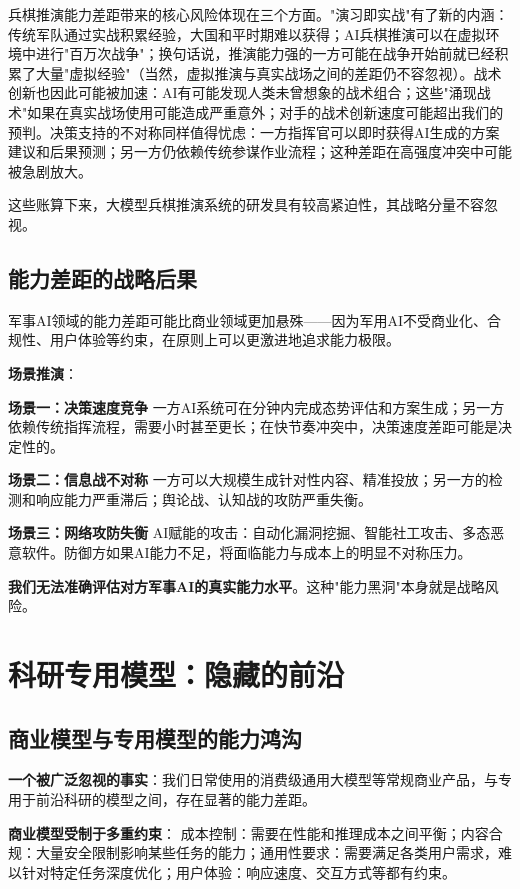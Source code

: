 兵棋推演能力差距带来的核心风险体现在三个方面。"演习即实战"有了新的内涵：传统军队通过实战积累经验，大国和平时期难以获得；AI兵棋推演可以在虚拟环境中进行"百万次战争"；换句话说，推演能力强的一方可能在战争开始前就已经积累了大量"虚拟经验"（当然，虚拟推演与真实战场之间的差距仍不容忽视）。战术创新也因此可能被加速：AI有可能发现人类未曾想象的战术组合；这些"涌现战术"如果在真实战场使用可能造成严重意外；对手的战术创新速度可能超出我们的预判。决策支持的不对称同样值得忧虑：一方指挥官可以即时获得AI生成的方案建议和后果预测；另一方仍依赖传统参谋作业流程；这种差距在高强度冲突中可能被急剧放大。

这些账算下来，大模型兵棋推演系统的研发具有较高紧迫性，其战略分量不容忽视。

\subsection{能力差距的战略后果}

军事AI领域的能力差距可能比商业领域更加悬殊——因为军用AI不受商业化、合规性、用户体验等约束，在原则上可以更激进地追求能力极限。

\textbf{场景推演}：

\textbf{场景一：决策速度竞争}
一方AI系统可在分钟内完成态势评估和方案生成；另一方依赖传统指挥流程，需要小时甚至更长；在快节奏冲突中，决策速度差距可能是决定性的。

\textbf{场景二：信息战不对称}
一方可以大规模生成针对性内容、精准投放；另一方的检测和响应能力严重滞后；舆论战、认知战的攻防严重失衡。

\textbf{场景三：网络攻防失衡}
AI赋能的攻击：自动化漏洞挖掘、智能社工攻击、多态恶意软件。防御方如果AI能力不足，将面临能力与成本上的明显不对称压力。

\textbf{我们无法准确评估对方军事AI的真实能力水平}。这种"能力黑洞"本身就是战略风险。

\section{科研专用模型：隐藏的前沿}

\subsection{商业模型与专用模型的能力鸿沟}

\textbf{一个被广泛忽视的事实}：我们日常使用的消费级通用大模型等常规商业产品，与专用于前沿科研的模型之间，存在显著的能力差距。

\textbf{商业模型受制于多重约束}：
成本控制：需要在性能和推理成本之间平衡；内容合规：大量安全限制影响某些任务的能力；通用性要求：需要满足各类用户需求，难以针对特定任务深度优化；用户体验：响应速度、交互方式等都有约束。

